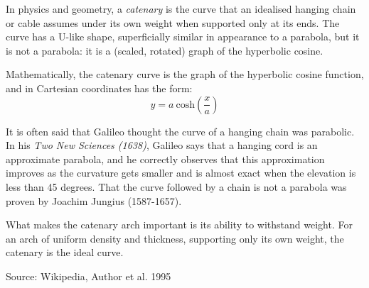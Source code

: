 \documentclass[11pt]{amsart}
\begin{document}
In physics and geometry, a \textit{catenary} is the curve that an idealised hanging chain or cable assumes under its own weight when supported only at its ends. The curve has a U-like shape, superficially similar in appearance to a parabola, but it is not a parabola: it is a (scaled, rotated) graph of the hyperbolic cosine. 

Mathematically, the catenary curve is the graph of the hyperbolic cosine function, and in Cartesian coordinates has the form:
\begin{equation}
y = a \: \mathrm{cosh}(\frac{x}{a})
\end{equation}

It is often said that Galileo thought the curve of a hanging chain was parabolic. In his \textit{Two New Sciences (1638)}, Galileo says that a hanging cord is an approximate parabola, and he correctly observes that this approximation improves as the curvature gets smaller and is almost exact when the elevation is less than 45 degrees. That the curve followed by a chain is not a parabola was proven by Joachim Jungius (1587-1657).

What makes the catenary arch important is its ability to withstand weight. For an arch of uniform density and thickness, supporting only its own weight, the catenary is the ideal curve.

Source: Wikipedia, Author et al. 1995
\end{document}
